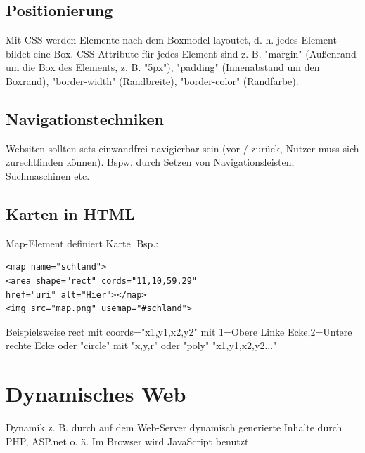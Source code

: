 \documentclass[12pt,landscape]{article}
\begin{document}
\begin{multicols}{3}
\subsection{Positionierung}
Mit CSS werden Elemente nach dem Boxmodel layoutet, d. h. jedes Element bildet eine Box. CSS-Attribute für jedes Element sind z. B. "margin" (Außenrand um die Box des Elements, z. B. "5px"), "padding" (Innenabstand um den Boxrand), "border-width" (Randbreite), "border-color" (Randfarbe).
\subsection{Navigationstechniken}
Websiten sollten sets einwandfrei navigierbar sein (vor / zurück, Nutzer muss sich zurechtfinden können). Bspw. durch Setzen von Navigationsleisten, Suchmaschinen etc.
\subsection{Karten in HTML}
Map-Element definiert Karte. Bsp.:
\begin{lstlisting}
<map name="schland">
<area shape="rect" cords="11,10,59,29"
href="uri" alt="Hier"></map>
<img src="map.png" usemap="#schland">
\end{lstlisting}
Beispielsweise rect mit coords="x1,y1,x2,y2" mit 1=Obere Linke Ecke,2=Untere rechte Ecke oder "circle" mit "x,y,r" oder "poly" "x1,y1,x2,y2..."
\section{Dynamisches Web}
Dynamik z. B. durch auf dem Web-Server dynamisch generierte Inhalte durch PHP, ASP.net o. ä. Im Browser wird JavaScript benutzt.

\end{multicols}
\end{document}
